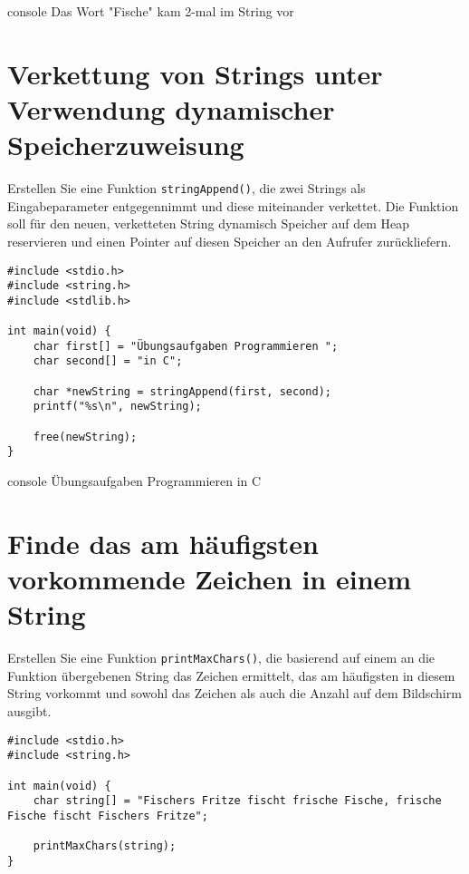 \begin{mybox}[Bildschirmausgabe]{console}
    Das Wort "Fische" kam 2-mal im String vor
\end{mybox}




\chapter{Verkettung von Strings unter Verwendung dynamischer Speicherzuweisung}

\vspace{10pt}

Erstellen Sie eine Funktion \texttt{stringAppend()}, die zwei Strings als
Eingabeparameter entgegennimmt und diese miteinander verkettet. Die Funktion
soll für den neuen, verketteten String dynamisch Speicher auf dem Heap
reservieren und einen Pointer auf diesen Speicher an den Aufrufer zurückliefern.

\Vorlage
\begin{verbatim}
#include <stdio.h>
#include <string.h>
#include <stdlib.h>

int main(void) {
    char first[] = "Übungsaufgaben Programmieren ";
    char second[] = "in C";

    char *newString = stringAppend(first, second);
    printf("%s\n", newString);

    free(newString);
}
\end{verbatim}

\begin{mybox}[Bildschirmausgabe]{console}
    Übungsaufgaben Programmieren in C
\end{mybox}





\chapter{Finde das am häufigsten vorkommende Zeichen in einem String}

\vspace{10pt}

Erstellen Sie eine Funktion \texttt{printMaxChars()}, die basierend auf
einem an die Funktion übergebenen String das Zeichen ermittelt, das am
häufigsten in diesem String vorkommt und sowohl das Zeichen als auch die Anzahl
auf dem Bildschirm ausgibt.

\Vorlage
\begin{verbatim}
#include <stdio.h>
#include <string.h>

int main(void) {
    char string[] = "Fischers Fritze fischt frische Fische, frische Fische fischt Fischers Fritze";

    printMaxChars(string);
}
\end{verbatim}

